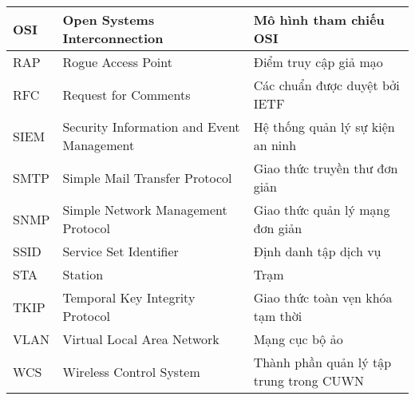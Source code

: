 \begin{table}[H]
\centering
\small
\setlength{\extrarowheight}{1pt}
\begin{tabular}{|l|p{6cm}|p{7cm}|}
\hline
OSI                               & Open Systems Interconnection                                            & Mô hình tham chiếu OSI                                       \\ \hline
RAP                               & Rogue Access Point                                                      & Điểm truy cập giả mạo                                        \\ \hline
RFC                               & Request for Comments                                                    & Các chuẩn được duyệt bởi IETF                                \\ \hline
SIEM                              & Security Information and Event Management                               & Hệ thống quản lý sự kiện an ninh                             \\ \hline
SMTP                              & Simple Mail Transfer Protocol                                           & Giao thức truyền thư đơn giản                                \\ \hline
SNMP                              & Simple Network Management Protocol                                      & Giao thức quản lý mạng đơn giản                              \\ \hline
SSID                              & Service Set Identifier                                                  & Định danh tập dịch vụ                                        \\ \hline
STA                               & Station                                                                 & Trạm                                                         \\ \hline
TKIP                              & Temporal Key Integrity Protocol                                         & Giao thức toàn vẹn khóa tạm thời                            \\ \hline
VLAN                              & Virtual Local Area Network                                              & Mạng cục bộ ảo                                               \\ \hline
WCS                               & Wireless Control System                                                 & Thành phần quản lý tập trung trong CUWN                      \\ \hline

\end{tabular}
\end{table}
